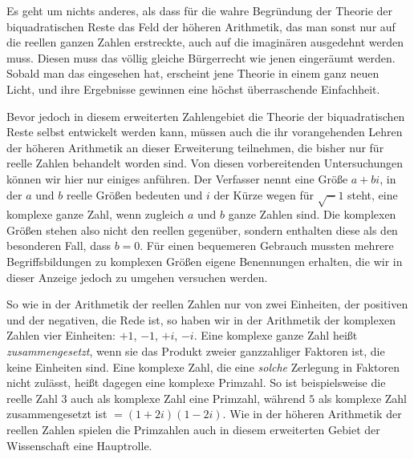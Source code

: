Es geht um nichts anderes, als dass für die wahre Begründung der Theorie der biquadratischen Reste das Feld der höheren Arithmetik, das man sonst nur auf die reellen ganzen Zahlen erstreckte, auch auf die imaginären ausgedehnt werden muss. Diesen muss das völlig gleiche Bürgerrecht wie jenen eingeräumt werden. Sobald man das eingesehen hat, erscheint jene Theorie in einem ganz neuen Licht, und ihre Ergebnisse gewinnen eine höchst überraschende Einfachheit.

Bevor jedoch in diesem erweiterten Zahlengebiet die Theorie der biquadratischen Reste selbst entwickelt werden kann, müssen auch die ihr vorangehenden Lehren der höheren Arithmetik an dieser Erweiterung teilnehmen, die bisher nur für reelle Zahlen behandelt worden sind. Von diesen vorbereitenden Untersuchungen können wir hier nur einiges anführen. Der Verfasser nennt eine Größe $a+bi$, in der $a$ und $b$ reelle Größen bedeuten und $i$ der Kürze wegen für $\surd-1$ steht, eine komplexe ganze Zahl, wenn zugleich $a$ und $b$ ganze Zahlen sind. Die komplexen Größen stehen also nicht den reellen gegenüber, sondern enthalten diese als den besonderen Fall, dass $b=0$. Für einen bequemeren Gebrauch mussten mehrere Begriffsbildungen zu komplexen Größen eigene Benennungen erhalten, die wir in dieser Anzeige jedoch zu umgehen versuchen werden.

So wie in der Arithmetik der reellen Zahlen nur von zwei Einheiten, der positiven und der negativen, die Rede ist, so haben wir in der Arithmetik der
komplexen Zahlen vier Einheiten: $+1$, $-1$, $+i$, $-i$. Eine komplexe ganze Zahl heißt \emph{zusammengesetzt}, wenn sie das Produkt zweier ganzzahliger Faktoren ist, die keine Einheiten sind. Eine komplexe Zahl, die eine \emph{solche} Zerlegung in Faktoren nicht zulässt, heißt dagegen eine komplexe Primzahl. So ist beispielsweise die reelle Zahl $3$ auch als komplexe Zahl eine Primzahl, während $5$ als komplexe Zahl zusammengesetzt ist $=(1+2i)(1-2i)$. Wie in der höheren Arithmetik der reellen Zahlen spielen die Primzahlen auch in diesem erweiterten Gebiet der Wissenschaft eine Hauptrolle.

